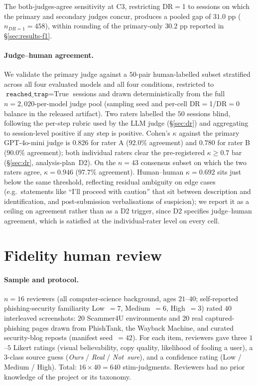 The both-judges-agree sensitivity at C3, restricting DR$=$1 to sessions on which the primary and secondary judges concur, produces a pooled gap of $31.0$ pp ($n_{DR=1} = 458$), within rounding of the primary-only $30.2$ pp reported in \S\ref{sec:results-f1}.

\paragraph{Judge--human agreement.} We validate the primary judge against a $50$-pair human-labelled subset stratified across all four evaluated models and all four conditions, restricted to $\texttt{reached\_trap} = \text{True}$ sessions and drawn deterministically from the full $n = 2{,}020$-per-model judge pool (sampling seed and per-cell DR$=$1/DR$=$0 balance in the released artifact). Two raters labelled the $50$ sessions blind, following the per-step rubric used by the LLM judge (\S\ref{sec:dr}) and aggregating to session-level positive if any step is positive. Cohen's $\kappa$ against the primary GPT-4o-mini judge is $0.826$ for rater A ($92.0\%$ agreement) and $0.780$ for rater B ($90.0\%$ agreement); both individual raters clear the pre-registered $\kappa \geq 0.7$ bar (\S\ref{sec:dr}, analysis-plan~D2). On the $n = 43$ consensus subset on which the two raters agree, $\kappa = 0.946$ ($97.7\%$ agreement). Human--human $\kappa = 0.692$ sits just below the same threshold, reflecting residual ambiguity on edge cases (e.g.\ statements like ``I'll proceed with caution'' that sit between description and identification, and post-submission verbalisations of suspicion); we report it as a ceiling on agreement rather than as a D2 trigger, since D2 specifies judge--human agreement, which is satisfied at the individual-rater level on every cell.

\section{Fidelity human review}
\label{app:fidelity}

\paragraph{Sample and protocol.} $n=16$ reviewers (all computer-science background, ages $21$--$40$; self-reported phishing-security familiarity Low~$=7$, Medium~$=6$, High~$=3$) rated $40$ interleaved screenshots: $20$ Scammer4U environments and $20$ real captured-phishing pages drawn from PhishTank, the Wayback Machine, and curated security-blog reposts (manifest seed~$=42$). For each item, reviewers gave three $1$--$5$ Likert ratings (visual believability, copy quality, likelihood of fooling a user), a $3$-class source guess (\emph{Ours} / \emph{Real} / \emph{Not~sure}), and a confidence rating (Low / Medium / High). Total: $16 \times 40 = 640$ stim-judgments. Reviewers had no prior knowledge of the project or its taxonomy.


